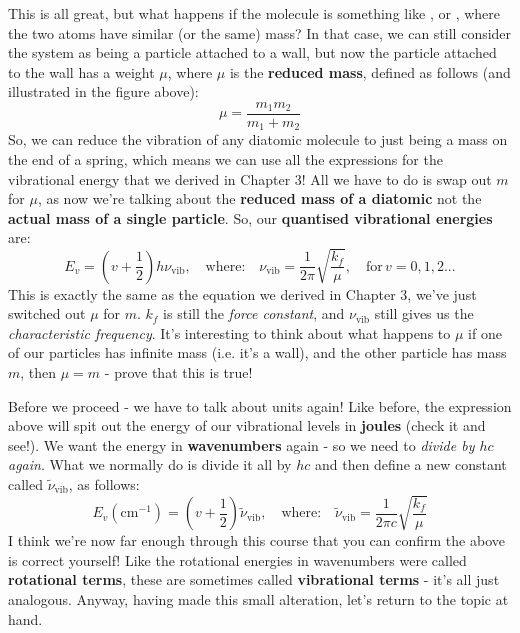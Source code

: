\documentclass{memoir}[11pt,oneside,a4paper,openany]
\newcommand{\nuv}{\ensuremath{\nu_{\text{vib}}}}
\begin{document}
This is all great, but what happens if the molecule is something like , or , where the two atoms have similar (or the same) mass? In that case, we can still consider the system as being a particle attached to a wall, but now the particle attached to the wall has a weight $\mu$, where $\mu$ is the \textbf{reduced mass}, defined as follows (and illustrated in the figure above):
\begin{equation}
	\mu = \frac{m_1m_2}{m_1+m_2}
\end{equation}
So, we can reduce the vibration of any diatomic molecule to just being a mass on the end of a spring, which means we can use all the expressions for the vibrational energy that we derived in Chapter 3! All we have to do is swap out $m$ for $\mu$, as now we're talking about the \textbf{reduced mass of a diatomic} not the \textbf{actual mass of a single particle}. So, our \textbf{quantised vibrational energies} are:
\begin{equation}
	E_v = (v+\frac{1}{2})h\nuv,\quad \text{where:}\quad \nuv = \frac{1}{2\pi}\sqrt{\frac{k_f}{\mu}},\quad\text{for}\,v=0,1,2...
\end{equation}
This is exactly the same as the equation we derived in Chapter 3, we've just switched out $\mu$ for $m$. $k_f$ is still the \emph{force constant}, and $\nuv$ still gives us the \emph{characteristic frequency}. It's interesting to think about what happens to $\mu$ if one of our particles has infinite mass (i.e. it's a wall), and the other particle has mass $m$, then $\mu=m$ - prove that this is true!

Before we proceed - we have to talk about units again! Like before, the expression above will spit out the energy of our vibrational levels in \textbf{joules} (check it and see!). We want the energy in \textbf{wavenumbers} again - so we need to \emph{divide by $hc$ again}. What we normally do is divide it all by $hc$ and then define a new constant called $\tilde{\nu}_{\text{vib}}$, as follows:
\begin{equation}
	E_v (\text{cm}^{-1}) = (v+\frac{1}{2})\tilde{\nu}_{\text{vib}},\quad \text{where:}\quad \tilde{\nu}_{\text{vib}} = \frac{1}{2\pi c}\sqrt{\frac{k_f}{\mu}}
\end{equation}
I think we're now far enough through this course that you can confirm the above is correct yourself! Like the rotational energies in wavenumbers were called \textbf{rotational terms}, these are sometimes called \textbf{vibrational terms} - it's all just analogous. Anyway, having made this small alteration, let's return to the topic at hand.
\end{document}
